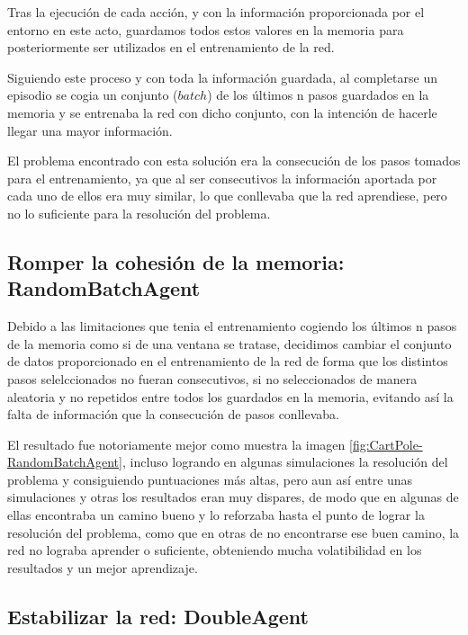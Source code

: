 Tras la ejecución de cada acción, y con la información proporcionada por el entorno en este acto, guardamos todos estos valores en la memoria para posteriormente ser utilizados en el entrenamiento de la red.

Siguiendo este proceso y con toda la información guardada, al completarse un episodio se cogia un conjunto ($batch$) de los últimos n pasos guardados en la memoria y se entrenaba la red con dicho conjunto, con la intención de hacerle llegar una mayor información.

El problema encontrado con esta solución era la consecución de los pasos tomados para el entrenamiento, ya que al ser consecutivos la información aportada por cada uno de ellos era muy similar, lo que conllevaba que la red aprendiese, pero no lo suficiente para la resolución del problema.

\subsection{Romper la cohesión de la memoria: RandomBatchAgent}

Debido a las limitaciones que tenia el entrenamiento cogiendo los últimos n pasos de la memoria como si de una ventana se tratase, decidimos cambiar el conjunto de datos proporcionado en el entrenamiento de la red de forma que los distintos pasos selelccionados no fueran consecutivos, si no seleccionados de manera aleatoria y no repetidos entre todos los guardados en la memoria, evitando así la falta de información que la consecución de pasos conllevaba.

El resultado fue notoriamente mejor como muestra la imagen \ref{fig:CartPole-RandomBatchAgent}, incluso logrando en algunas simulaciones la resolución del problema y consiguiendo puntuaciones más altas, pero aun así entre unas simulaciones y otras los resultados eran muy dispares, de modo que en algunas de ellas encontraba un camino bueno y lo reforzaba hasta el punto de lograr la resolución del problema, como que en otras de no encontrarse ese buen camino, la red no lograba aprender o suficiente, obteniendo mucha volatibilidad en los resultados y un mejor aprendizaje.


\subsection{Estabilizar la red: DoubleAgent}

